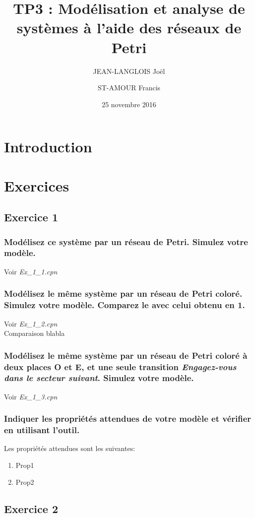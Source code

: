 \documentclass[french]{article}
\title{TP3 : Modélisation et analyse de systèmes à l'aide des réseaux de Petri}
\author{
    JEAN-LANGLOIS Joël
    \and
    ST-AMOUR Francis
  }
\date{25 novembre 2016}
\begin{document}
\maketitle

\section{Introduction}

\section{Exercices}

\subsection{Exercice 1}
\subsubsection{Modélisez ce système par un réseau de Petri. Simulez votre modèle.}
Voir \textit{Ex\_1\_1.cpn}
\subsubsection{Modélisez le même système par un réseau de Petri coloré. Simulez votre modèle. Comparez le avec celui obtenu 
en 1.}
Voir \textit{Ex\_1\_2.cpn} \\

Comparaison blabla
\subsubsection{Modélisez le même système par un réseau de Petri coloré à deux places O et E, et une seule transition 
\textit{Engagez-vous dans le secteur suivant}. Simulez votre modèle.}
Voir \textit{Ex\_1\_3.cpn}
\subsubsection{Indiquer les propriétés attendues de votre modèle et vérifier en utilisant l’outil.}
Les propriétés attendues sont les suivantes:
\begin{enumerate}
	\item Prop1
	\item Prop2
\end{enumerate}
\subsection{Exercice 2}
\end{document}
